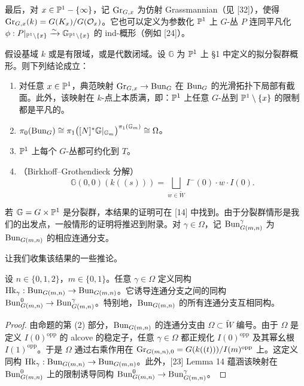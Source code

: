 最后，对 $x\in\mathbb{P}^1-\{\infty\}$，记 $\mathrm{Gr}_{G,x}$ 为仿射 Grassmannian（见 [32]），使得 $\mathrm{Gr}_{G,x}(k)=G(K_x)/G(\mathcal O_x)$。它也可以定义为参数化 $\mathbb{P}^1$ 上 $G$-丛 $P$ 连同平凡化 $\phi:P|_{\mathbb{P}^1\setminus\{x\}}\xrightarrow{\sim}\mathbb{G}_{\mathbb{P}^1\setminus\{x\}}$ 的 ind-概形（例如 [24]）。

\begin{proposition}
假设基域 $k$ 或是有限域，或是代数闭域。设 $\mathbb{G}$ 为 $\mathbb{P}^1$ 上 §1 中定义的拟分裂群概形。则下列结论成立：
\begin{enumerate}[label=(\arabic*), leftmargin=1.8em, itemsep=.2em]
\item 对任意 $x\in\mathbb{P}^1$，典范映射 $\mathrm{Gr}_{G,x}\to\mathrm{Bun}_G$ 在 $\mathrm{Bun}_G$ 的光滑拓扑下局部有截面。此外，该映射在 $k$-点上本质满，即：$\mathbb{P}^1$ 上任意 $G$-丛到 $\mathbb{P}^1\setminus\{x\}$ 的限制都是平凡的。
\item $\pi_0(\mathrm{Bun}_G)\cong\pi_1\big([N]^*\mathbb{G}|_{\mathbb{G}_m}\big)^{\pi_1(\mathbb{G}_m)}\cong\Omega$。
\item $\mathbb{P}^1$ 上每个 $G$-丛都可约化到 $T$。
\item （Birkhoff--Grothendieck 分解）
\[
\mathbb{G}(0,0)(k((s)))=\bigsqcup_{w\in\widetilde W}I^-(0)\cdot w\cdot I(0).
\]
\end{enumerate}
\end{proposition}

若 $\mathbb{G}=G\times\mathbb{P}^1$ 是分裂群，本结果的证明可在 [14] 中找到。由于分裂群情形是我们的出发点，一般情形的证明将推迟到附录。对 $\gamma\in\Omega$，记 $\mathrm{Bun}^\gamma_{G(m,n)}$ 为 $\mathrm{Bun}_{G(m,n)}$ 的相应连通分支。

让我们收集该结果的一些推论。

\begin{corollary}
设 $n\in\{0,1,2\}$，$m\in\{0,1\}$。任意 $\gamma\in\Omega$ 定义同构 $\mathrm{Hk}_\gamma:\mathrm{Bun}_{G(m,n)}\to\mathrm{Bun}_{G(m,n)}$。它诱导连通分支之间的同构 $\mathrm{Bun}^0_{G(m,n)}\to\mathrm{Bun}^\gamma_{G(m,n)}$。特别地，$\mathrm{Bun}_{G(m,n)}$ 的所有连通分支互相同构。
\end{corollary}

\begin{proof}
由命题的第 (2) 部分，$\mathrm{Bun}_{G(m,n)}$ 的连通分支由 $\Omega\subset\widetilde W$ 编号。由于 $\Omega$ 是定义 $I(0)^{\mathrm{opp}}$ 的 alcove 的稳定子，任意 $\gamma\in\Omega$ 都正规化 $I(0)^{\mathrm{opp}}$ 及其幂幺根 $I(1)^{\mathrm{opp}}$。于是 $\Omega$ 通过右乘作用在 $\mathrm{Gr}_{G(m,n),0}=G(k((t)))/I(m)^{\mathrm{opp}}$ 上。这定义同构 $\mathrm{Hk}_\gamma:\mathrm{Bun}_{G(m,n)}\to\mathrm{Bun}_{G(m,n)}$。此外，[23] Lemma 14 蕴涵该映射在 $\mathrm{Bun}^0_{G(m,n)}$ 上的限制诱导同构 $\mathrm{Bun}^0_{G(m,n)}\to\mathrm{Bun}^\gamma_{G(m,n)}$。
\end{proof}

